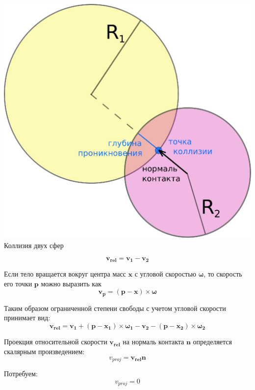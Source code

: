 \documentclass[xetex,12pt,compress,hyperref={xetex}]{beamer}
\begin{document}
 \begin{frame} 
 \begin{center}
   \includegraphics[scale=0.5]{SphereCollision}  \\
     \figurename{Коллизия двух сфер}
  \end{center}   
 \end{frame}

 \begin{frame}
 \begin{equation}
  \mathbf{v_{rel}} = \mathbf{v_1} - \mathbf{v_2}
  \end{equation}
 
  Если тело вращается вокруг центра масс $\mathbf{x}$  с угловой скоростью $\mathbf{\omega}$,
  то скорость его точки $\mathbf{p}$ можно выразить как
  \begin{equation}
  \mathbf{v_p} = (\mathbf{p} - \mathbf{x}) \times \mathbf{\omega} 
  \end{equation}
  
  Таким образом ограниченной степени свободы с учетом угловой скорости принимает вид:
  \begin{equation}
  \mathbf{v_{rel}} = \mathbf{v_1} + (\mathbf{p} - \mathbf{x_1}) \times \mathbf{\omega_{1}} -  \mathbf{v_2} - (\mathbf{p} - \mathbf{x_2}) \times \mathbf{\omega_{2}}
  \end{equation}
  
    Проекция относительной скорости $\mathbf{v_{rel}}$ на нормаль контакта $\mathbf{n}$ определяется скалярным произведением:
    \begin{equation}
    v_{proj} = \mathbf{v_{rel}} \mathbf{n}
    \end{equation}
    
    Потребуем: 
    \begin{equation}
    v_{proj} = 0
    \end{equation}
  \end{frame}
   
\end{document}
